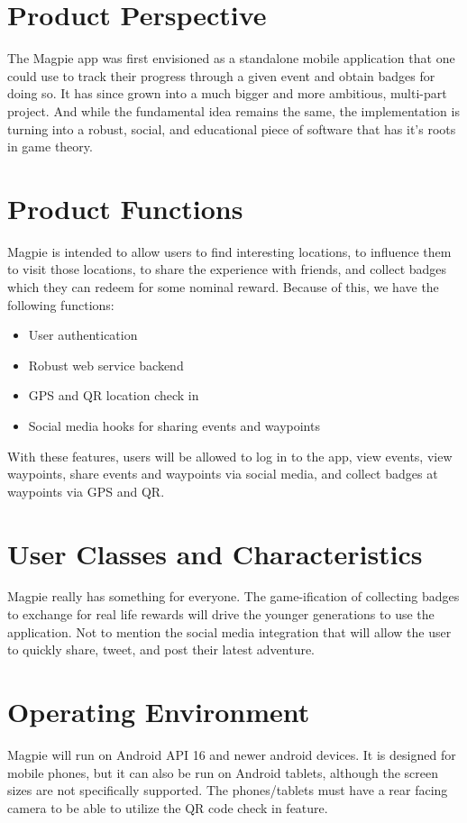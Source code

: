\documentclass{scrreprt}
\begin{document}
\section{Product Perspective}
The Magpie app was first envisioned as a standalone mobile application that one
could use to track their progress through a given event and obtain badges for doing so.
It has since grown into a much bigger and more ambitious, multi-part project. And while the
fundamental idea remains the same, the implementation is turning into a robust, social, and
educational piece of software that has it's roots in game theory.

\section{Product Functions}
Magpie is intended to allow users to find interesting locations, to influence them
to visit those locations, to share the experience with friends, and collect badges
which they can redeem for some nominal reward. Because of this, we have the
following functions:
\begin{itemize}
\item User authentication
\item Robust web service backend
\item GPS and QR location check in
\item Social media hooks for sharing events and waypoints
\end{itemize}
With these features, users will be allowed to log in to the app, view events,
view waypoints, share events and waypoints via social media, and collect
badges at waypoints via GPS and QR.

\section{User Classes and Characteristics}
Magpie really has something for everyone. The game-ification of collecting badges to
exchange for real life rewards will drive the younger generations to use the application.
Not to mention the social media integration that will allow the user to quickly share, tweet, and
post their latest adventure.

\section{Operating Environment}
Magpie will run on Android API 16 and newer android devices. It is designed for
mobile phones, but it can also be run on Android tablets, although the screen
sizes are not specifically supported. The phones/tablets must have a rear facing
camera to be able to utilize the QR code check in feature.
\end{document}
